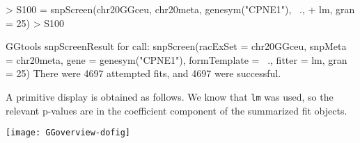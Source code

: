 \documentclass[12pt]{article}
\newcommand{\Rfunction}[1]{{\texttt{#1}}}
\begin{document}
\begin{Schunk}
\begin{Sinput}
> S100 = snpScreen(chr20GGceu, chr20meta, genesym("CPNE1"), ~., 
+     lm, gran = 25)
> S100
\end{Sinput}
\begin{Soutput}
GGtools snpScreenResult for call:
snpScreen(racExSet = chr20GGceu, snpMeta = chr20meta, gene = genesym("CPNE1"), 
    formTemplate = ~., fitter = lm, gran = 25)
There were 4697 attempted fits,
and 4697 were successful.
\end{Soutput}
\end{Schunk}
A primitive display is obtained as follows.  We know that \texttt{lm}
was used, so the relevant p-values are in the coefficient component
of the summarized fit objects.
\begin{Schunk}
\end{Schunk}
\texttt{[image: GGoverview-dofig]}


\end{document}

